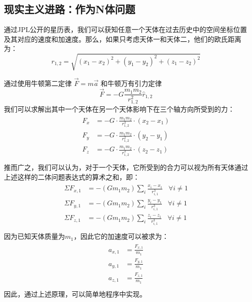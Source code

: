 \documentclass{ctexart}
\theoremstyle{definition}
\begin{document}
    \subsection{现实主义进路：作为N体问题}
        通过JPL公开的星历表，我们可以获知任意一个天体在过去历史中的空间坐标位置及其对应的速度和加速度。那么，如果只考虑天体一和天体二，他们的欧氏距离为：
        \begin{equation}
            r_{1,2} = \sqrt{(x_1 - x_2)^2+(y_1 - y_2)^2+(z_1 - z_2)^2}
        \end{equation}
        
        通过使用牛顿第二定律 $\Vec{F}=m\Vec{a}$ 和牛顿万有引力定律
        \begin{equation}
            \Vec{F}=-G\frac{m_1 m_2}{r_{1,2}^2}\hat{r}_{1,2}
        \end{equation}
        我们可以求解出其中一个天体在另一个天体影响下在三个轴方向所受到的力：
        \begin{align}
            \begin{split}
                F_x &= -G\cdot \frac{m_1 m_2}{r_{1,2}^3} \cdot (x_2 - x_1)\\
                F_y &= -G\cdot \frac{m_1 m_2}{r_{1,2}^2}\cdot (y_2 - y_1)\\
                F_z &= -G\cdot \frac{m_1 m_2}{r_{1,2}^3}\cdot (z_2 - z_1)\\
            \end{split}
        \end{align}
        推而广之，我们可以认为，对于一个天体，它所受到的合力可以视为所有天体通过上述这样的二体问题表达式的算术之和，即：
        \begin{align}
            \begin{split}
                \Sigma F_{x,1} &= -(G m_1 m_2) \sum_i \frac{x_i - x_1}{r_{i,1}^3}\;\;\; \forall i \neq 1 \\
                \Sigma F_{y,1} &= -(G m_1 m_2) \sum_i \frac{y_i - y_1}{r_{i,1}^3}\;\;\; \forall i \neq 1 \\
                \Sigma F_{z,1} &= -(G m_1 m_2) \sum_i \frac{z_i - z_1}{r_{i,1}^3}\;\;\; \forall i \neq 1 \\
            \end{split}
        \end{align}
        因为已知天体质量为$m_1$，因此它的加速度可以被求为：
        \begin{align}
            \begin{split}
                 a_{x,1} &= \frac{F_{x,1}}{m_1} \\
                 a_{y,1} &= \frac{F_{y,1}}{m_1} \\
                 a_{z,1} &= \frac{F_{z,1}}{m_1} \\
            \end{split}
        \end{align}
        因此，通过上述原理，可以简单地程序中实现。
        
\end{document}
